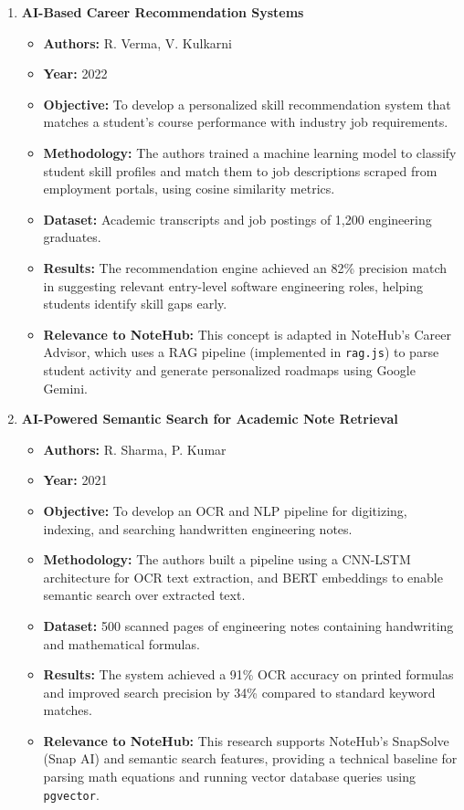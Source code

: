 \documentclass[12,Times new Roman,a4paper]{report}
\begin{document}
\begin{enumerate}
    \item \textbf{AI-Based Career Recommendation Systems}
    \begin{itemize}
        \item \textbf{Authors:} R. Verma, V. Kulkarni
        \item \textbf{Year:} 2022
        \item \textbf{Objective:} To develop a personalized skill recommendation system that matches a student's course performance with industry job requirements.
        \item \textbf{Methodology:} The authors trained a machine learning model to classify student skill profiles and match them to job descriptions scraped from employment portals, using cosine similarity metrics.
        \item \textbf{Dataset:} Academic transcripts and job postings of 1,200 engineering graduates.
        \item \textbf{Results:} The recommendation engine achieved an 82\% precision match in suggesting relevant entry-level software engineering roles, helping students identify skill gaps early.
        \item \textbf{Relevance to NoteHub:} This concept is adapted in NoteHub's Career Advisor, which uses a RAG pipeline (implemented in \texttt{rag.js}) to parse student activity and generate personalized roadmaps using Google Gemini.
    \end{itemize}

    \item \textbf{AI-Powered Semantic Search for Academic Note Retrieval}
    \begin{itemize}
        \item \textbf{Authors:} R. Sharma, P. Kumar
        \item \textbf{Year:} 2021
        \item \textbf{Objective:} To develop an OCR and NLP pipeline for digitizing, indexing, and searching handwritten engineering notes.
        \item \textbf{Methodology:} The authors built a pipeline using a CNN-LSTM architecture for OCR text extraction, and BERT embeddings to enable semantic search over extracted text.
        \item \textbf{Dataset:} 500 scanned pages of engineering notes containing handwriting and mathematical formulas.
        \item \textbf{Results:} The system achieved a 91\% OCR accuracy on printed formulas and improved search precision by 34\% compared to standard keyword matches.
        \item \textbf{Relevance to NoteHub:} This research supports NoteHub's SnapSolve (Snap AI) and semantic search features, providing a technical baseline for parsing math equations and running vector database queries using \texttt{pgvector}.
    \end{itemize}


\end{enumerate}
\end{document}
